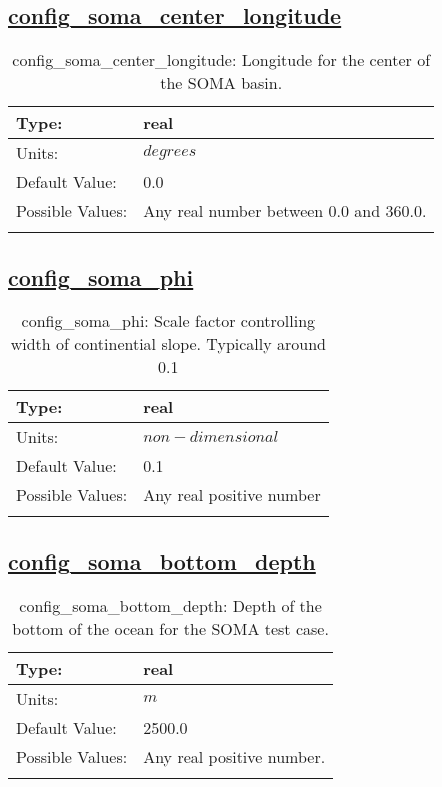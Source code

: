 \subsection[config\_soma\_center\_longitude]{\hyperref[sec:nm_tab_soma]{config\_soma\_center\_longitude}}
\label{subsec:nm_sec_config_soma_center_longitude}
\begin{center}
\begin{longtable}{| p{2.0in} || p{4.0in} |}
    \hline
    Type: & real \\
    \hline
    Units: & $degrees$ \\
    \hline
    Default Value: & 0.0 \\
    \hline
    Possible Values: & Any real number between 0.0 and 360.0. \\
    \hline
    \caption{config\_soma\_center\_longitude: Longitude for the center of the SOMA basin.}
\end{longtable}
\end{center}
\subsection[config\_soma\_phi]{\hyperref[sec:nm_tab_soma]{config\_soma\_phi}}
\label{subsec:nm_sec_config_soma_phi}
\begin{center}
\begin{longtable}{| p{2.0in} || p{4.0in} |}
    \hline
    Type: & real \\
    \hline
    Units: & $non-dimensional$ \\
    \hline
    Default Value: & 0.1 \\
    \hline
    Possible Values: & Any real positive number \\
    \hline
    \caption{config\_soma\_phi: Scale factor controlling width of continential slope. Typically around 0.1}
\end{longtable}
\end{center}
\subsection[config\_soma\_bottom\_depth]{\hyperref[sec:nm_tab_soma]{config\_soma\_bottom\_depth}}
\label{subsec:nm_sec_config_soma_bottom_depth}
\begin{center}
\begin{longtable}{| p{2.0in} || p{4.0in} |}
    \hline
    Type: & real \\
    \hline
    Units: & $m$ \\
    \hline
    Default Value: & 2500.0 \\
    \hline
    Possible Values: & Any real positive number. \\
    \hline
    \caption{config\_soma\_bottom\_depth: Depth of the bottom of the ocean for the SOMA test case.}
\end{longtable}
\end{center}
